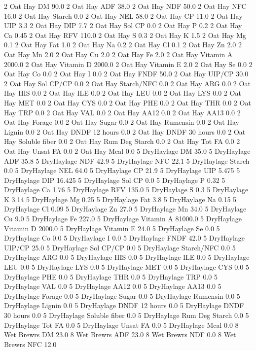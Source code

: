 \documentclass[letterpaper,10pt,english]{sphinxmanual}
\begin{document}
\begin{sphinxVerbatim}[commandchars=\\\{\},numbers=left,firstnumber=1,stepnumber=1]
2 Oat Hay DM 90.0
2 Oat Hay ADF 38.0
2 Oat Hay NDF 50.0
2 Oat Hay NFC 16.0
2 Oat Hay Starch 0.0
2 Oat Hay NEL 58.0
2 Oat Hay CP 11.0
2 Oat Hay UIP 3.3
2 Oat Hay DIP 7.7
2 Oat Hay Sol CP 0.0
2 Oat Hay P 0.2
2 Oat Hay Ca 0.45
2 Oat Hay RFV 110.0
2 Oat Hay S 0.3
2 Oat Hay K 1.5
2 Oat Hay Mg 0.1
2 Oat Hay Fat 1.0
2 Oat Hay Na 0.2
2 Oat Hay Cl 0.1
2 Oat Hay Zn 2.0
2 Oat Hay Mn 2.0
2 Oat Hay Cu 2.0
2 Oat Hay Fe 2.0
2 Oat Hay Vitamin A 2000.0
2 Oat Hay Vitamin D 2000.0
2 Oat Hay Vitamin E 2.0
2 Oat Hay Se 0.0
2 Oat Hay Co 0.0
2 Oat Hay I 0.0
2 Oat Hay FNDF 50.0
2 Oat Hay UIP/CP 30.0
2 Oat Hay Sol CP/CP 0.0
2 Oat Hay Starch/NFC 0.0
2 Oat Hay ARG 0.0
2 Oat Hay HIS 0.0
2 Oat Hay ILE 0.0
2 Oat Hay LEU 0.0
2 Oat Hay LYS 0.0
2 Oat Hay MET 0.0
2 Oat Hay CYS 0.0
2 Oat Hay PHE 0.0
2 Oat Hay THR 0.0
2 Oat Hay TRP 0.0
2 Oat Hay VAL 0.0
2 Oat Hay AA\PYGZsh{}12 0.0
2 Oat Hay AA\PYGZsh{}13 0.0
2 Oat Hay \PYGZpc{} Forage 0.0
2 Oat Hay Sugar \PYGZpc{} 0.0
2 Oat Hay Rumensin 0.0
2 Oat Hay Lignin 0.0
2 Oat Hay DNDF 12 hours 0.0
2 Oat Hay DNDF 30 hours 0.0
2 Oat Hay Soluble fiber 0.0
2 Oat Hay Rum Deg Starch 0.0
2 Oat Hay Tot FA 0.0
2 Oat Hay Unsat FA 0.0
2 Oat Hay Mcal 0.0
5 DryHaylage DM 35.0
5 DryHaylage ADF 35.8
5 DryHaylage NDF 42.9
5 DryHaylage NFC 22.1
5 DryHaylage Starch 0.0
5 DryHaylage NEL 64.0
5 DryHaylage CP 21.9
5 DryHaylage UIP 5.475
5 DryHaylage DIP 16.425
5 DryHaylage Sol CP 0.0
5 DryHaylage P 0.32
5 DryHaylage Ca 1.76
5 DryHaylage RFV 135.0
5 DryHaylage S 0.3
5 DryHaylage K 3.14
5 DryHaylage Mg 0.25
5 DryHaylage Fat 3.8
5 DryHaylage Na 0.15
5 DryHaylage Cl 0.09
5 DryHaylage Zn 27.0
5 DryHaylage Mn 34.0
5 DryHaylage Cu 9.0
5 DryHaylage Fe 227.0
5 DryHaylage Vitamin A 81000.0
5 DryHaylage Vitamin D 2000.0
5 DryHaylage Vitamin E 24.0
5 DryHaylage Se 0.0
5 DryHaylage Co 0.0
5 DryHaylage I 0.0
5 DryHaylage FNDF 42.0
5 DryHaylage UIP/CP 25.0
5 DryHaylage Sol CP/CP 0.0
5 DryHaylage Starch/NFC 0.0
5 DryHaylage ARG 0.0
5 DryHaylage HIS 0.0
5 DryHaylage ILE 0.0
5 DryHaylage LEU 0.0
5 DryHaylage LYS 0.0
5 DryHaylage MET 0.0
5 DryHaylage CYS 0.0
5 DryHaylage PHE 0.0
5 DryHaylage THR 0.0
5 DryHaylage TRP 0.0
5 DryHaylage VAL 0.0
5 DryHaylage AA\PYGZsh{}12 0.0
5 DryHaylage AA\PYGZsh{}13 0.0
5 DryHaylage \PYGZpc{} Forage 0.0
5 DryHaylage Sugar \PYGZpc{} 0.0
5 DryHaylage Rumensin 0.0
5 DryHaylage Lignin 0.0
5 DryHaylage DNDF 12 hours 0.0
5 DryHaylage DNDF 30 hours 0.0
5 DryHaylage Soluble fiber 0.0
5 DryHaylage Rum Deg Starch 0.0
5 DryHaylage Tot FA 0.0
5 DryHaylage Unsat FA 0.0
5 DryHaylage Mcal 0.0
8 Wet Brewrs DM 23.0
8 Wet Brewrs ADF 23.0
8 Wet Brewrs NDF 0.0
8 Wet Brewrs NFC 12.0

\end{sphinxVerbatim}
\end{document}
